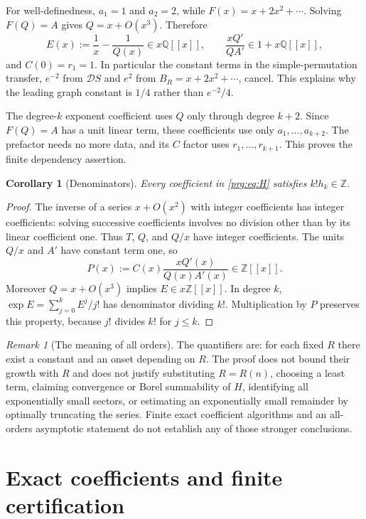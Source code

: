 \documentclass[11pt,letterpaper]{article}
\numberwithin{equation}{section}
\newtheorem{corollary}[theorem]{Corollary}
\theoremstyle{definition}\newtheorem{definition}[theorem]{Definition}
\theoremstyle{remark}\newtheorem{remark}[theorem]{Remark}
\newcommand{\ZZ}{\mathbb Z}
\newcommand{\QQ}{\mathbb Q}
\begin{document}
For well-definedness, $a_1=1$ and $a_2=2$, while
$F(x)=x+2x^2+\cdots$. Solving $F(Q)=A$ gives
$Q=x+O(x^3)$. Therefore
\[
 E(x):=\frac1x-\frac1{Q(x)}\in x\QQ[[x]],
 \qquad \frac{xQ'}{QA'}\in1+x\QQ[[x]],
\]
and $C(0)=r_1=1$. In particular the constant terms in the
simple-permutation transfer, $e^{-2}$ from $\mathcal D S$ and
$e^2$ from $B_R=x+2x^2+\cdots$, cancel. This explains why the
leading graph constant is $1/4$ rather than $e^{-2}/4$.

The degree-$k$ exponent coefficient uses $Q$ only through degree
$k+2$. Since $F(Q)=A$ has a unit linear term, these coefficients
use only $a_1,\ldots,a_{k+2}$. The prefactor needs no more data,
and its $C$ factor uses $r_1,\ldots,r_{k+1}$. This proves the
finite dependency assertion.

\begin{corollary}[Denominators]\label{prg:cor:denominator}
Every coefficient in \eqref{prg:eq:H} satisfies $k!h_k\in\ZZ$.
\end{corollary}
\begin{proof}
The inverse of a series $x+O(x^2)$ with integer coefficients has
integer coefficients: solving successive coefficients involves no
division other than by its linear coefficient one. Thus $T$, $Q$,
and $Q/x$ have integer coefficients. The units $Q/x$ and $A'$ have
constant term one, so
\[
 P(x):=C(x)\frac{xQ'(x)}{Q(x)A'(x)}\in\ZZ[[x]].
\]
Moreover $Q=x+O(x^3)$ implies $E\in x\ZZ[[x]]$. In degree $k$,
$\exp E=\sum_{j=0}^kE^j/j!$ has denominator dividing $k!$.
Multiplication by $P$ preserves this property, because $j!$ divides
$k!$ for $j\leq k$.
\end{proof}

\begin{remark}[The meaning of all orders]\label{prg:rem:fixed}
The quantifiers are: for each fixed $R$ there exist a constant and
an onset depending on $R$. The proof does not bound their growth
with $R$ and does not justify substituting $R=R(n)$, choosing a
least term, claiming convergence or Borel summability of $H$, identifying all
exponentially small sectors, or estimating an
exponentially small remainder by optimally truncating the series.
Finite exact coefficient algorithms and an all-orders asymptotic
statement do not establish any of those stronger conclusions.
\end{remark}

\section{Exact coefficients and finite certification}\label{prg:sec:coefficients}
\end{document}
